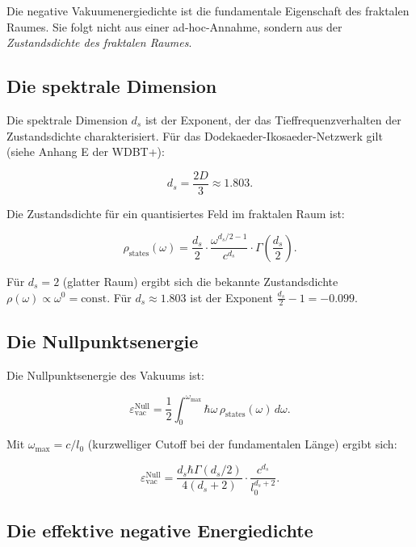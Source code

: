 Die negative Vakuumenergiedichte ist die fundamentale Eigenschaft des fraktalen Raumes. Sie folgt nicht aus einer ad-hoc-Annahme, sondern aus der
\emph{Zustandsdichte des fraktalen Raumes}.

\subsection{Die spektrale Dimension}

Die spektrale Dimension \(d_s\) ist der Exponent, der das Tieffrequenzverhalten der Zustandsdichte charakterisiert. Für das Dodekaeder-Ikosaeder-Netzwerk gilt
(siehe Anhang E der WDBT+):

\begin{equation}
d_s = \frac{2D}{3} \approx 1.803. \tag{2.2}
\end{equation}

Die Zustandsdichte für ein quantisiertes Feld im fraktalen Raum ist:

\begin{equation}
\rho_{\text{states}}(\omega) = \frac{d_s}{2} \cdot \frac{\omega^{d_s/2 - 1}}{c^{d_s}} \cdot \Gamma\left(\frac{d_s}{2}\right). \tag{2.3}
\end{equation}

Für \(d_s = 2\) (glatter Raum) ergibt sich die bekannte Zustandsdichte \(\rho(\omega) \propto \omega^{0} = \text{const}\). Für \(d_s \approx 1.803\) ist der Exponent \(\frac{d_s}{2} - 1 = -0.099\).

\subsection{Die Nullpunktsenergie}

Die Nullpunktsenergie des Vakuums ist:

\begin{equation}
\varepsilon_{\text{vac}}^{\text{Null}} = \frac{1}{2} \int_{0}^{\omega_{\text{max}}} \hbar \omega \, \rho_{\text{states}}(\omega) \, d\omega. \tag{2.4}
\end{equation}

Mit \(\omega_{\text{max}} = c/l_0\) (kurzwelliger Cutoff bei der fundamentalen Länge) ergibt sich:

\begin{equation}
\varepsilon_{\text{vac}}^{\text{Null}} = \frac{d_s \hbar \Gamma(d_s/2)}{4(d_s + 2)} \cdot \frac{c^{d_s}}{l_0^{d_s + 2}}. \tag{2.5}
\end{equation}

\subsection{Die effektive negative Energiedichte}

